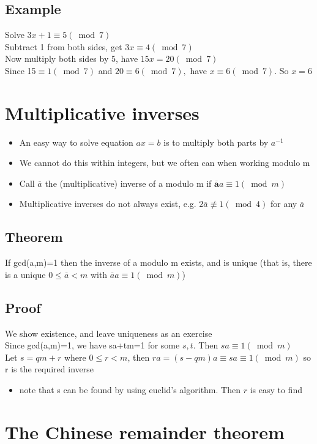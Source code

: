 \documentclass{article}[18pt]
\begin{document}
\subsection{Example}
Solve $3x+1 \equiv 5 (\bmod 7)$\\
Subtract 1 from both sides, get $3x\equiv 4(\bmod 7)$\\
Now multiply both sides by 5, have $15x=20 (\bmod 7)$\\
Since 15$\equiv 1 ( \bmod 7 )$ and $20 \equiv 6 ( \bmod 7 ) ,$ have $x \equiv 6 ( \bmod 7 ) .$ So $x = 6$
\section{Multiplicative inverses}
\begin{itemize}
	\item An easy way to solve equation $ax=b$ is to multiply both parts by $a^{-1}$
	\item We cannot do this within integers, but we often can when working modulo m
	\item Call $\overline{a}$ the (multiplicative) inverse of a modulo m if $\overline { \mathbf { a } } a \equiv 1 ( \bmod m )$
	\item Multiplicative inverses do not always exist, e.g. $2\overline{a}\not\equiv 1 (\bmod 4)$ for any $\overline{a}$
\end{itemize}
\subsection{Theorem}
If gcd(a,m)=1 then the inverse of a modulo m exists, and is unique (that is, there is a unique $0\leqslant\overline{a}<m$ with $\overline{a}a\equiv 1 (\bmod m)$)
\subsection{Proof}
We show existence, and leave uniqueness as an exercise\\
Since gcd(a,m)=1, we have sa+tm=1 for some $s,t$. Then $sa\equiv 1 (\bmod m)$\\
Let $s=qm+r$ where $0\leqslant r <m$, then $ra=(s-qm)a\equiv sa \equiv 1 (\bmod m)$ so r is the required inverse
\begin{itemize}
	\item note that s can be found by using euclid's algorithm. Then $r$ is easy to find
\end{itemize}
\section{The Chinese remainder theorem}
\end{document}
